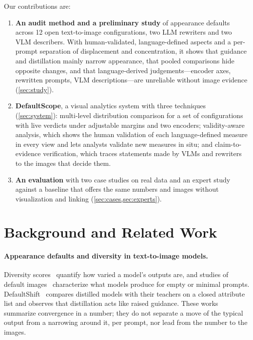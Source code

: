 \documentclass[review]{vgtc}                 %
\newcommand{\sysname}{DefaultScope}
\begin{document}
\noindent Our contributions are:
\begin{enumerate}\itemsep0pt
\item \textbf{An audit method and a preliminary study} of appearance defaults across 12 open text-to-image configurations, two LLM rewriters and two VLM describers. With human-validated, language-defined aspects and a per-prompt separation of displacement and concentration, it shows that guidance and distillation mainly narrow appearance, that pooled comparisons hide opposite changes, and that language-derived judgements---encoder axes, rewritten prompts, VLM descriptions---are unreliable without image evidence (\cref{sec:study}).
\item \textbf{\sysname{}}, a visual analytics system with three techniques (\cref{sec:system}): multi-level distribution comparison for a set of configurations with live verdicts under adjustable margins and two encoders; validity-aware analysis, which shows the human validation of each language-defined measure in every view and lets analysts validate new measures in situ; and claim-to-evidence verification, which traces statements made by VLMs and rewriters to the images that decide them.
\item \textbf{An evaluation} with two case studies on real data and an expert study against a baseline that offers the same numbers and images without visualization and linking (\cref{sec:cases,sec:experts}).
\end{enumerate}

\section{Background and Related Work}

\paragraph{Appearance defaults and diversity in text-to-image models.}
Diversity scores~\cite{vendi,dimcim,grade,attrdiv} quantify how varied a model's outputs are, and studies of default images~\cite{defaultimages} characterize what models produce for empty or minimal prompts. DefaultShift~\cite{defaultshift} compares distilled models with their teachers on a closed attribute list and observes that distillation acts like raised guidance. These works summarize convergence in a number; they do not separate a move of the typical output from a narrowing around it, per prompt, nor lead from the number to the images.
\end{document}
